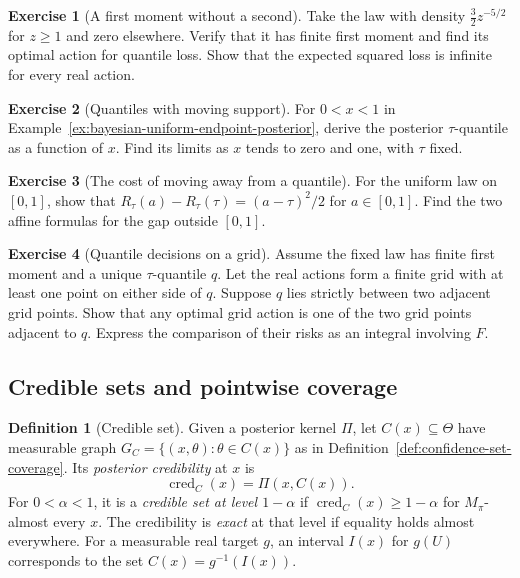\documentclass[11pt,oneside]{book}
\theoremstyle{definition}
\newtheorem{definition}[theorem]{Definition}
\newtheorem{exercise}{Exercise}[section]
\theoremstyle{remark}
\begin{document}
\begin{exercise}[A first moment without a second]
\label{exer:bayesian-quantile-heavy-tail}
Take the law with density $\tfrac32 z^{-5/2}$ for $z\geq1$ and
zero elsewhere. Verify that it has finite first moment and find
its optimal action for quantile loss. Show that the expected
squared loss is infinite for every real action.
\end{exercise}

\begin{exercise}[Quantiles with moving support]
\label{exer:bayesian-quantile-moving-support}
For $0<x<1$ in Example~\ref{ex:bayesian-uniform-endpoint-posterior},
derive the posterior $\tau$-quantile as a function of $x$.
Find its limits as $x$ tends to zero and one, with $\tau$ fixed.
\end{exercise}

\begin{exercise}[The cost of moving away from a quantile]
\label{exer:bayesian-quantile-uniform-gap}
For the uniform law on $[0,1]$, show that
$R_\tau(a)-R_\tau(\tau)=(a-\tau)^2/2$ for $a\in[0,1]$.
Find the two affine formulas for the gap outside $[0,1]$.
\end{exercise}

\begin{exercise}[Quantile decisions on a grid]
\label{exer:bayesian-quantile-grid}
Assume the fixed law has finite first moment and a unique
$\tau$-quantile $q$. Let the real actions form a finite grid
with at least one point on either side of $q$. Suppose $q$ lies
strictly between two adjacent grid points. Show that any optimal grid action is one
of the two grid points adjacent to $q$. Express the comparison
of their risks as an integral involving $F$.
\end{exercise}

\subsection{Credible sets and pointwise coverage}
\label{subsec:bayesian-credible-sets}

\begin{definition}[Credible set]
\label{def:bayesian-credible-set}
Given a posterior kernel $\Pi$, let $C(x)\subseteq\Theta$ have
measurable graph $G_C=\{(x,\theta):\theta\in C(x)\}$ as in
Definition~\ref{def:confidence-set-coverage}. Its
\emph{posterior credibility} at $x$ is
\[
\operatorname{cred}_C(x)=\Pi(x,C(x)).
\]
For $0<\alpha<1$, it is a \emph{credible set at level $1-\alpha$} if
$\operatorname{cred}_C(x)\geq1-\alpha$ for $M_\pi$-almost every $x$.
The credibility is \emph{exact} at that level if equality holds
almost everywhere. For a measurable real target $g$, an interval
$I(x)$ for $g(U)$ corresponds to the set $C(x)=g^{-1}(I(x))$.
\end{definition}
\end{document}
